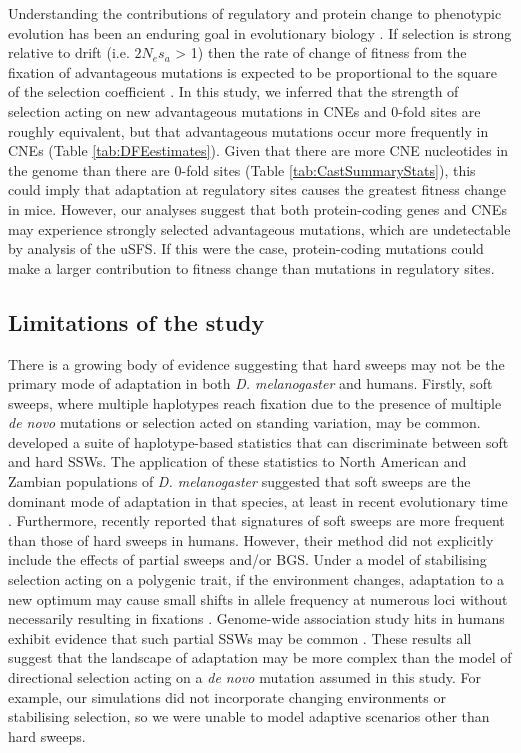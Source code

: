 	Understanding the contributions of regulatory and protein change to phenotypic evolution has been an enduring goal in evolutionary biology \citep{RN347, RN346, RN348}. If selection is strong relative to drift (i.e. $2N_es_a$ > 1) then the rate of change of fitness from the fixation of advantageous mutations is expected to be proportional to the square of the selection coefficient \citep{RN391}. In this study, we inferred that the strength of selection acting on new advantageous mutations in CNEs and 0-fold sites are roughly equivalent, but that advantageous mutations occur more frequently in CNEs (Table \ref{tab:DFEestimates}). Given that there are more CNE nucleotides in the genome than there are 0-fold sites (Table \ref{tab:CastSummaryStats}), this could imply that adaptation at regulatory sites causes the greatest fitness change in mice. However, our analyses suggest that both protein-coding genes and CNEs may experience strongly selected advantageous mutations, which are undetectable by analysis of the uSFS. If this were the case, protein-coding mutations could make a larger contribution to fitness change than mutations in regulatory sites.

\subsection{Limitations of the study}

	There is a growing body of evidence suggesting that hard sweeps may not be the primary mode of adaptation in both \textit{D. melanogaster} and humans. Firstly, soft sweeps, where multiple haplotypes reach fixation due to the presence of multiple \textit{de novo} mutations or selection acted on standing variation, may be common. \cite{RN208} developed a suite of haplotype-based statistics that can discriminate between soft and hard SSWs. The application of these statistics to North American and Zambian populations of \textit{D. melanogaster} suggested that soft sweeps are the dominant mode of adaptation in that species, at least in recent evolutionary time \citep{RN208,RN303}. Furthermore, \cite{RN337} recently reported that signatures of soft sweeps are more frequent than those of hard sweeps in humans. However, their method did not explicitly include the effects of partial sweeps and/or BGS. Under a model of stabilising selection acting on a polygenic trait, if the environment changes, adaptation to a new optimum may cause small shifts in allele frequency at numerous loci without necessarily resulting in fixations \citep{RN390, RN147}. Genome-wide association study hits in humans exhibit evidence that such partial SSWs may be common \citep{RN301}. These results all suggest that the landscape of adaptation may be more complex than the model of directional selection acting on a \textit{de novo} mutation assumed in this study. For example, our simulations did not incorporate changing environments or stabilising selection, so we were unable to model adaptive scenarios other than hard sweeps. 

